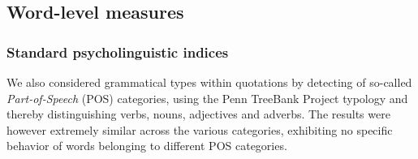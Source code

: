 
\subsection{Word-level measures}

\subsubsection{Standard psycholinguistic indices}


We also considered grammatical types within quotations by detecting of so-called \emph{Part-of-Speech} (POS) categories, using the Penn TreeBank Project typology \citep{Santorini90} and thereby distinguishing verbs, nouns, adjectives and 
adverbs.  The results were however extremely similar across the various categories, exhibiting no specific behavior of words belonging to different POS categories. %


